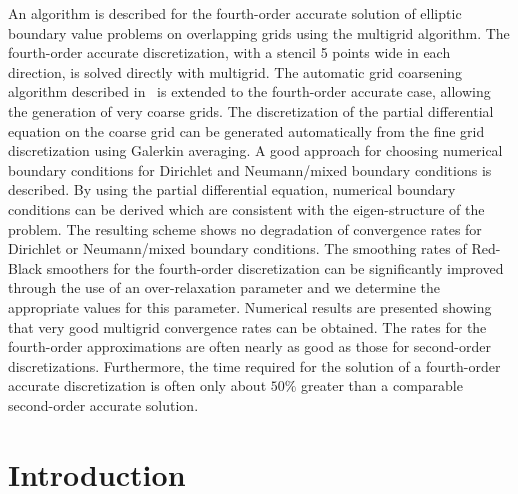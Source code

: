 \documentclass[12pt]{article}
\begin{document}
\begin{flushleft}
  An algorithm is described for the fourth-order accurate solution of elliptic boundary
value problems on overlapping grids using the multigrid algorithm. The
fourth-order accurate discretization, with a stencil 5 points wide in each
direction, is solved directly with multigrid. The automatic grid coarsening algorithm
described in~\cite{OnMultigrid} is extended to the fourth-order accurate case, allowing the
generation of very coarse grids.
%
The discretization of the partial differential equation on the
coarse grid can be generated automatically from the fine grid discretization
using Galerkin averaging.
%
A good approach for choosing numerical boundary conditions for Dirichlet and Neumann/mixed
boundary conditions is described. By using the partial differential equation, 
numerical boundary conditions
can be derived which are consistent with the eigen-structure of the problem.
The resulting scheme shows no degradation of convergence rates for Dirichlet or Neumann/mixed
boundary conditions.
%
The smoothing rates of Red-Black smoothers for the fourth-order discretization
can be significantly improved through
the use of an over-relaxation parameter and we determine the appropriate values
for this parameter.
%
Numerical results are presented showing that very good multigrid convergence rates can be obtained. 
The rates for the fourth-order approximations are often nearly as
good as those for second-order discretizations. 
Furthermore, the time required for the solution of a fourth-order accurate discretization 
is often only about $50\%$ greater than a comparable second-order accurate solution.

\end{flushleft}

\vfill\eject
\tableofcontents



\vfill\eject
\section{Introduction}
\end{document}
